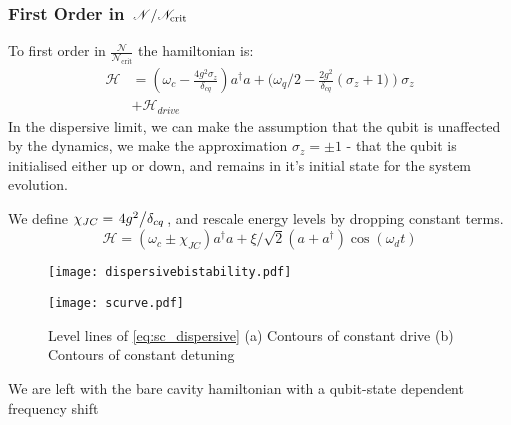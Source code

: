\subsubsection{First Order in $\flatfrac{\mathscr{N}}{\mathscr{N}_{\text{crit}}}$}
To first order in $\frac{\mathscr{N}}{\mathscr{N}_{\text{crit}}}$ the hamiltonian is:
\begin{align}
  \mathscr{H} &= \left(\omega_c
    - \frac{4g^2\sigma_z}{\delta_{cq}}\right) a ^ \dagger a
    + (\omega_q/2 - \frac{2g^2}{\delta_{cq}} \left(\sigma_z + 1)\right)\sigma_z\nonumber\\
    &+ \mathscr{H}_{drive}
\end{align}
In the dispersive limit, we can make the assumption that the qubit is unaffected by the dynamics, we make the approximation $\sigma_z = \pm 1$ - that the qubit is initialised either up or down, and remains in it's initial state for the system evolution.

We define $\chi_{JC} = \flatfrac{4g^2}{\delta_{cq}}$, and rescale energy levels by dropping constant terms.
\begin{equation}
    \mathscr{H} = \left(\omega_c \pm \chi_{JC}\right) a ^ \dagger a
    + \xi/\sqrt{2} ( a + a^\dagger ) \cos(\omega_d t)
\end{equation}
\begin{figure*}[!bht]
  \centering
  \begin{minipage}{0.5\linewidth}
    \vspace*{-0.5cm}
    \hspace*{-1cm}
    \texttt{[image: dispersivebistability.pdf]}
  \end{minipage}%
  \begin{minipage}{0.5\linewidth}
    \texttt{[image: scurve.pdf]}  
  \end{minipage}
  \caption{Level lines of \cref{eq:sc_dispersive} (a) Contours of constant drive (b) Contours of constant detuning}
  \label{fig:sc_dispersive}
\end{figure*}
We are left with the bare cavity hamiltonian with a qubit-state dependent frequency shift
